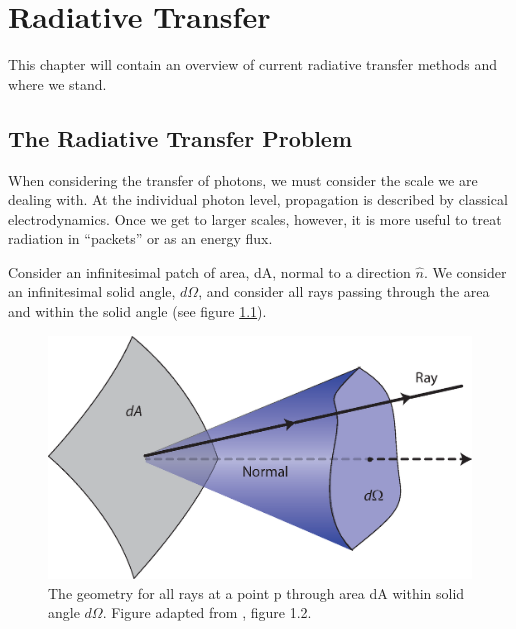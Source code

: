 \pagestyle{fancy}
\headheight 20pt
\chead{}
\lfoot{}
\cfoot{\thepage}
\rfoot{}
\renewcommand{\headrulewidth}{0.1pt}
\renewcommand{\footrulewidth}{0.1pt}

\chapter{Radiative Transfer}
\label{chap:radtransfer}

\thispagestyle{fancy}

This chapter will contain an overview of current radiative transfer methods and where we stand.

\section{The Radiative Transfer Problem}
\label{sec:rtformulation}

When considering the transfer of photons, we must consider the scale we are dealing with. At the individual photon level, propagation is described by classical electrodynamics. Once we get to larger scales, however, it is more useful to treat radiation in ``packets'' or as an energy flux.

Consider an infinitesimal patch of area, dA, normal to a direction $\hat{n}$. We consider an infinitesimal solid angle, $d\Omega$, and consider all rays passing through the area and within the solid angle (see figure \ref{fig:intensity}).

\begin{figure}
\includegraphics[width=\textwidth]{graphics/intensity.eps}
\caption[A visualization of how intensity is measured.]{The geometry for all rays at a point p through area dA within solid angle $d\Omega$. Figure adapted from \citet{rybickiLightman86}, figure 1.2.}
\label{fig:intensity}
\end{figure}

